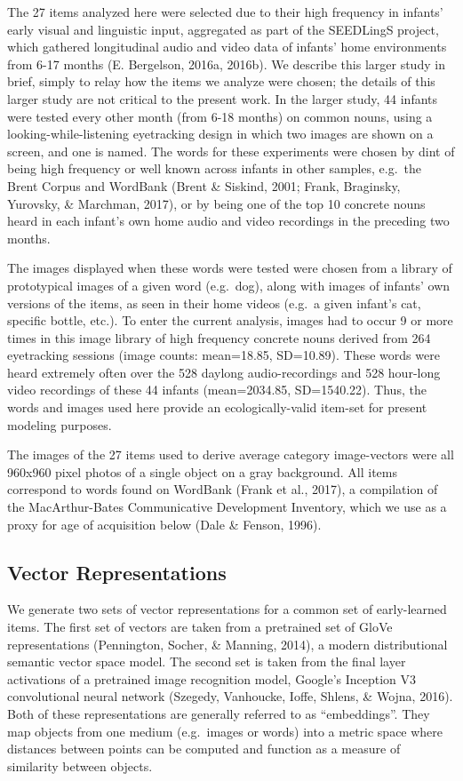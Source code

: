 \documentclass[10pt, letterpaper]{article}
\begin{document}
The 27 items analyzed here were selected due to their high frequency in
infants' early visual and linguistic input, aggregated as part of the
SEEDLingS project, which gathered longitudinal audio and video data of
infants' home environments from 6-17 months (E. Bergelson, 2016a,
2016b). We describe this larger study in brief, simply to relay how the
items we analyze were chosen; the details of this larger study are not
critical to the present work. In the larger study, 44 infants were
tested every other month (from 6-18 months) on common nouns, using a
looking-while-listening eyetracking design in which two images are shown
on a screen, and one is named. The words for these experiments were
chosen by dint of being high frequency or well known across infants in
other samples, e.g.~the Brent Corpus and WordBank (Brent \& Siskind,
2001; Frank, Braginsky, Yurovsky, \& Marchman, 2017), or by being one of
the top 10 concrete nouns heard in each infant's own home audio and
video recordings in the preceding two months.

The images displayed when these words were tested were chosen from a
library of prototypical images of a given word (e.g.~dog), along with
images of infants' own versions of the items, as seen in their home
videos (e.g.~a given infant's cat, specific bottle, etc.). To enter the
current analysis, images had to occur 9 or more times in this image
library of high frequency concrete nouns derived from 264 eyetracking
sessions (image counts: mean=18.85, SD=10.89). These words were heard
extremely often over the 528 daylong audio-recordings and 528 hour-long
video recordings of these 44 infants (mean=2034.85, SD=1540.22). Thus,
the words and images used here provide an ecologically-valid item-set
for present modeling purposes.

The images of the 27 items used to derive average category image-vectors
were all 960x960 pixel photos of a single object on a gray background.
All items correspond to words found on WordBank (Frank et al., 2017), a
compilation of the MacArthur-Bates Communicative Development Inventory,
which we use as a proxy for age of acquisition below (Dale \& Fenson,
1996).

\subsection{Vector Representations}\label{vector-representations}

We generate two sets of vector representations for a common set of
early-learned items. The first set of vectors are taken from a
pretrained set of GloVe representations (Pennington, Socher, \& Manning,
2014), a modern distributional semantic vector space model. The second
set is taken from the final layer activations of a pretrained image
recognition model, Google's Inception V3 convolutional neural network
(Szegedy, Vanhoucke, Ioffe, Shlens, \& Wojna, 2016). Both of these
representations are generally referred to as ``embeddings''. They map
objects from one medium (e.g.~images or words) into a metric space where
distances between points can be computed and function as a measure of
similarity between objects.
\end{document}
